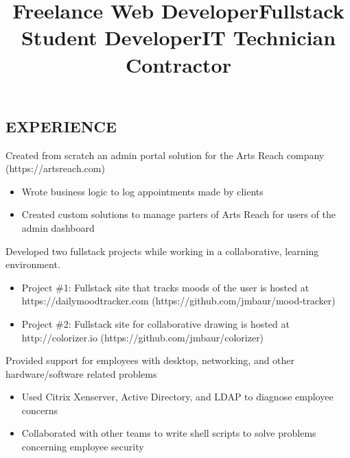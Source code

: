 \documentclass[margin]{resume}
\begin{document}
\begin{resume}
\section{EXPERIENCE}

\title{\textbf{Freelance Web Developer}}
\begin{position}
	Created from scratch an admin portal solution for the Arts Reach company\\(https://artsreach.com)
	\begin{itemize}
		\item Wrote business logic to log appointments made by clients
		\item Created custom solutions to manage parters of Arts Reach for users of the admin dashboard
	\end{itemize}
\end{position}

\title{\textbf{Fullstack Student Developer}}
\begin{position}
	Developed two fullstack projects while working in a collaborative, learning environment.
	\begin{itemize}
		\item Project \#1: Fullstack site that tracks moods of the user is hosted at\\https://dailymoodtracker.com (https://github.com/jmbaur/mood-tracker)
		\item Project \#2: Fullstack site for collaborative drawing is hosted at\\http://colorizer.io (https://github.com/jmbaur/colorizer)
	\end{itemize}
\end{position}

\title{\textbf{IT Technician} Contractor}
\begin{position}
	Provided support for employees with desktop, networking, and other hardware/software related problems
	\begin{itemize}
		\item Used Citrix Xenserver, Active Directory, and LDAP to diagnose employee concerns
		\item Collaborated with other teams to write shell scripts to solve problems concerning employee security
	\end{itemize}
\end{position}


\end{resume}
\end{document}
